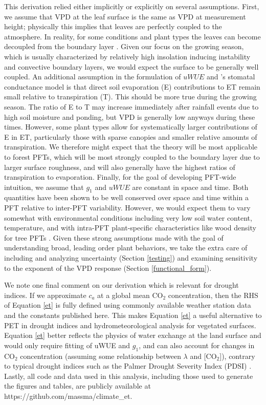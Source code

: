\documentclass[draft,linenumbers]{agujournal}
\begin{document}
This derivation relied either implicitly or explicitly on several
assumptions. First, we assume that VPD at the leaf surface is the same as VPD at measurement height; physically this implies that leaves are perfectly
coupled to the atmosphere. In reality, for some conditions and plant
types the leaves can become decoupled from the boundary layer
\citep{De_2017, Medlyn_2017}. Given our focus on the growing season,
which is usually characterized by relatively high insolation inducing
instability and convective boundary layers, we would expect the
surface to be generally well coupled. An
additional assumption in the formulation of $uWUE$ \citep{Zhou_2014,
  Zhou_2015} and \citet{Medlyn_2017}'s stomatal conductance model is
that direct soil evaporation (E) contributions to ET remain small
relative to transpiration (T). This should be more true during the
growing season. The ratio of E to T may increase immediately after
rainfall events due to high soil moisture and ponding, but VPD is
generally low anyways during these times. However, some plant types
allow for systematically larger contributions of E in ET,
particularly those with sparse canopies and smaller relative amounts
of transpiration. We therefore might expect that the theory will be
most applicable to forest PFTs, which will be most strongly coupled to
the boundary layer due to larger surface roughness, and will also
generally have the highest ratios of transpiration to
evaporation. Finally, for the goal of developing PFT-wide intuition,
we assume that $g_1$ and $uWUE$ are constant in space and time. Both
quantities have been shown to be well conserved over space and time
within a PFT relative to inter-PFT variability. However, we would
expect them to vary somewhat with environmental conditions including very low
soil water content, temperature, and with intra-PFT plant-specific
characteristics like wood density for tree PFTs
\citep{Lin_2015}. Given these strong assumptions made with the goal of
understanding broad, leading order plant behaviors, we take the extra
care of including and analyzing uncertainty (Section \ref{testing})
and examining sensitivity to the exponent of the VPD response (Section
\ref{functional_form}).

We note one final comment on our derivation which is relevant for
drought indices. If we approximate $c_a$ at a global mean CO$_2$
concentration, then the RHS of Equation \ref{et} is fully defined
using commonly available weather station data and the constants
published here. This makes Equation \ref{et} a useful alternative to
PET in drought indices and hydrometeorological analysis for vegetated
surfaces. Equation \ref{et} better reflects the physics of water
exchange at the land surface and would only require fitting of uWUE
and $g_1$, and can also account for changes in CO$_2$ concentration
(assuming some relationship between $\lambda$ and [CO$_2$]), contrary
to typical drought indices such as the Palmer Drought Severity Index
(PDSI) \citep{Swann_2016, Lemordant_2016, Lemordant_2018}. Lastly, all
code and data used in this analysis, including those used to generate
the figures and tables, are publicly available at
https://github.com/massma/climate\_et.
\end{document}
